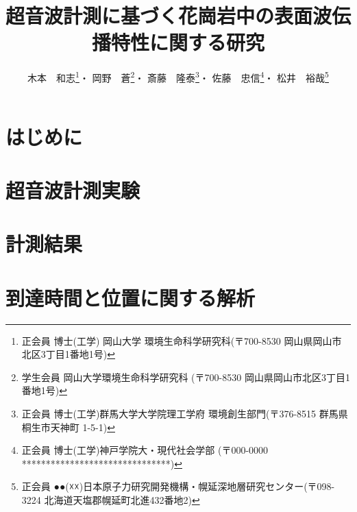 \documentclass{jsce}
\title{
	超音波計測に基づく花崗岩中の表面波伝播特性に関する研究
}%
\author{木本　和志\thanks{正会員 博士(工学) 岡山大学 環境生命科学研究科(〒700-8530 岡山県岡山市北区3丁目1番地1号)\email{kimoto@cc.okayama-u.ac.jp}}・
岡野　蒼\thanks{学生会員 岡山大学環境生命科学研究科 (〒700-8530 岡山県岡山市北区3丁目1番地1号)}・
斎藤　隆泰\thanks{正会員 博士(工学)群馬大学大学院理工学府 環境創生部門(〒376-8515 群馬県桐生市天神町 1-5-1)}・
佐藤　忠信\thanks{正会員 博士(工学)神戸学院大・現代社会学部 (〒000-0000 *******************************)}・
松井　裕哉\thanks{正会員 ●●(☓☓)日本原子力研究開発機構・幌延深地層研究センター(〒098-3224 北海道天塩郡幌延町北進432番地2)}
}
\begin{document}
\maketitle
\section{はじめに}
	
\section{超音波計測実験}
	
\section{計測結果}
	
\section{到達時間と位置に関する解析 }
	
\end{document}
